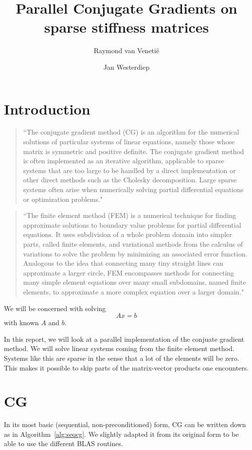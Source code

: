 \documentclass[11pt]{amsart}
\theoremstyle{definition}
\begin{document}
\title{Parallel Conjugate Gradients on sparse stiffness matrices}
\author{Raymond van Veneti\"e \and Jan Westerdiep}
\maketitle

\section{Introduction}
\begin{quote}
``The conjugate gradient method (CG) is an algorithm for the numerical solutions of particular systems of linear equations, namely those whose matrix is symmetric and positive definite. The conjugate gradient method is often implemented as an iterative algorithm, applicable to sparse systems that are too large to be handled by a direct implementation or other direct methods such as the Cholesky decomposition. Large sparse systems often arise when numerically solving partial differential equations or optimization problems." \cite{wiki:cg}
\end{quote}

\begin{quote}
``The finite element method (FEM) is a numerical technique for finding approximate solutions to boundary value problems for partial differential equations. It uses subdivision of a whole problem domain into simpler parts, called finite elements, and variational methods from the calculus of variations to solve the problem by minimizing an associated error function. Analogous to the idea that connecting many tiny straight lines can approximate a larger circle, FEM encompasses methods for connecting many simple element equations over many small subdomains, named finite elements, to approximate a more complex equation over a larger domain." \cite{wiki:fem}
\end{quote}

We will be concerned with solving
\[
  Ax = b
\]
with known $A$ and $b$.

In this report, we will look at a parallel implementation of the conjuate gradient method. We will solve linear systems coming from the finite element method. Systems like this are sparse in the sense that a lot of the elements will be zero. This makes it possible to skip parts of the matrix-vector products one encounters.

\section{CG}
In its most basic (sequential, non-preconditioned) form, CG can be written down as in Algorithm~\ref{alg:seqcg}. \cite[Alg.~4.8]{biss04} We slightly adapted it from its original form to be able to use the different BLAS \cite{blas} routines.
\end{document}
